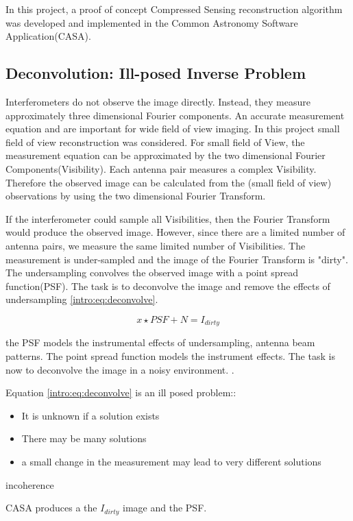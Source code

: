 In this project, a proof of concept Compressed Sensing reconstruction algorithm was developed and implemented in the Common Astronomy Software Application(CASA). 


\subsection{Deconvolution: Ill-posed Inverse Problem}
Interferometers do not observe the image directly. Instead, they measure approximately three dimensional Fourier components. An accurate measurement equation and are important for wide field of view imaging. In this project small field of view reconstruction was considered. For small field of View, the measurement equation can be approximated by the two dimensional Fourier Components(Visibility). Each antenna pair measures a complex Visibility. Therefore the observed image can be calculated from the (small field of view) observations by using the two dimensional Fourier Transform.

If the interferometer could sample all Visibilities, then the Fourier Transform would produce the observed image. However, since there are a limited number of antenna pairs, we  measure the same limited number of Visibilities. The measurement is under-sampled and the image of the Fourier Transform is "dirty". The undersampling convolves the observed image with a point spread function(PSF). The task is to deconvolve the image and remove the effects of undersampling \eqref{intro:eq:deconvolve}.

\begin{equation}\label{intro:eq:deconvolve}
x \star  PSF + N = I_{dirty} 
\end{equation}

the PSF models the instrumental effects of undersampling, antenna beam patterns.
The point spread function models the instrument effects. The task is now to deconvolve the image in a noisy environment.  .

Equation \eqref{intro:eq:deconvolve} is an ill posed problem::
\begin{itemize}
	\item It is unknown if a solution exists
	\item There may be many solutions
	\item a small change in the measurement may lead to very different solutions 
\end{itemize}

incoherence


CASA produces a the $I_{dirty}$ image and the PSF.


